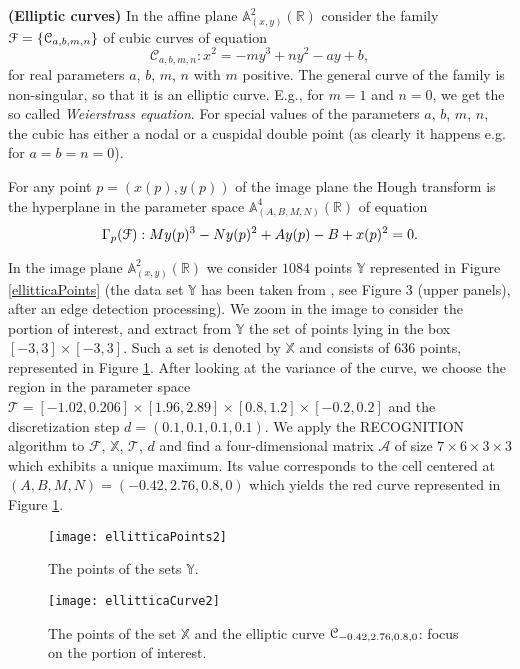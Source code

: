 \documentclass[10pt]{article}
\newcommand\sC{{\cal C}}
\newcommand\sF{{\cal F}}
\newcommand\reals{{\mathbb R}}
\newtheorem{examp}[theorem]{Example}
\newenvironment{example*}{\begin{examp}\em}{\end{examp}}
\begin{document}
{\begin{example*}\label{EC}{\bf (Elliptic curves)} 
In the affine plane ${\mathbb A}_{(x,y)}^2(\reals)$ consider the family $\sF=\{ \mathcal{C}_{a,b,m,n}\}$ 
of cubic curves of equation
  $$
\mathcal{C}_{a,b,m,n}: x^2=-my^3 + ny^2-ay + b, 
$$
for real parameters $a$, $b$, $m$, $n$ with $m$ positive.
The general curve of the family is non-singular, so that it is an elliptic curve. 
E.g., for $m=1$ and $n=0$,  we get the so called {\em Weierstrass equation}. 
For special values of the parameters $a$, $b$, $m$, $n$, the cubic  has either 
a nodal or a cuspidal double point (as clearly  it happens e.g. for $a=b=n=0$). 

For any point $p=(x(p), y(p))$ of the image plane the Hough transform is the 
hyperplane  in the parameter space ${\mathbb A}_{(A,B,M,N)}^4(\reals)$ of equation
$$
\Gamma_p(\sF): My(p)^3-Ny(p)^2+Ay(p) -B+x(p)^2=0.
$$

In the image plane ${\mathbb A}_{(x,y)}^2(\reals)$ we consider $1084$ points $\mathbb Y$ represented in Figure \ref{ellitticaPoints}
(the data set $\mathbb Y$ has been taken from \cite{etal}, see Figure 3 (upper panels), after an edge detection processing).
We zoom in the image to consider the portion
of interest, and extract from $\mathbb Y$ the  set of points lying in the box $[-3,3] \times [-3, 3]$.
Such a set  is denoted by $\mathbb X$ and consists of $636$ points,
represented in Figure \ref{ellitticaCurve}.
After looking at the variance of the curve, we choose the region  in the parameter space
$\mathcal T =[-1.02,0.206] \times [1.96,2.89]  \times [0.8,1.2] \times [-0.2,0.2]$
and the discretization step $d=(0.1, 0.1, 0.1, 0.1)$.
We apply the RECOGNITION algorithm to 
$\mathcal F$, $\mathbb X$, $\mathcal T$, $d$ and find a four-dimensional
matrix $\mathcal A$ of size $7 \times 6 \times 3 \times 3$ which exhibits 
a unique  maximum. Its value 
corresponds to the cell centered at $(A,B,M,N) =(-0.42, 2.76, 0.8, 0)$
which yields the red curve represented in Figure \ref{ellitticaCurve}.

\begin{figure}[htb]
\centering
\begin{minipage}[c]{0.50\textwidth}
\texttt{[image: ellitticaPoints2]}
\caption{\small{The points of the sets $\mathbb Y$.} }
\label{ellitticaPoints}
\end{minipage}%
\hspace{0.29cm}
\begin{minipage}[c]{0.47\textwidth}
\texttt{[image: ellitticaCurve2]}
\caption{\small{The points of the set $\mathbb X$ and the elliptic curve 
$\sC_{-0.42, 2.76, 0.8, 0}$: focus on the portion of interest.}}\label{ellitticaCurve}
\end{minipage}
\end{figure}
\end{example*}

}
\end{document}

